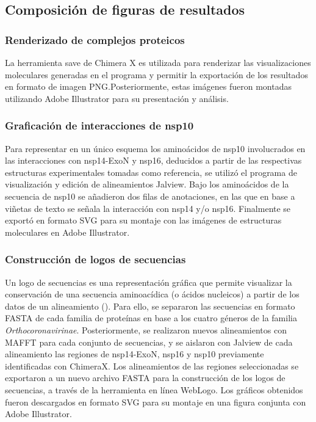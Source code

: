 \subsection{Composición de figuras de resultados}

\subsubsection{Renderizado de complejos proteicos}

La herramienta save de Chimera X es utilizada para renderizar las 
visualizaciones moleculares generadas en el programa y permitir la 
exportación de los resultados en formato de imagen PNG.\@ Posteriormente, 
estas imágenes fueron montadas utilizando Adobe Illustrator para su 
presentación y análisis.

\subsubsection{Graficación de interacciones de nsp10}

Para representar en un único esquema los aminoácidos de nsp10 involucrados 
en las interacciones con nsp14-ExoN y nsp16, deducidos a partir de las 
respectivas estructuras experimentales tomadas como referencia, se utilizó 
el programa de visualización y edición de alineamientos Jalview. Bajo los 
aminoácidos de la secuencia de nsp10 se añadieron dos filas de anotaciones, 
en las que en base a viñetas de texto se señala la interacción con nsp14 y/o
nsp16. Finalmente se exportó en formato SVG para su montaje con las imágenes
de estructuras moleculares en Adobe Illustrator.

\subsubsection{Construcción de logos de secuencias}

Un logo de secuencias es una representación gráfica que permite visualizar 
la conservación de una secuencia aminoacídica (o ácidos nucleicos) a partir 
de los datos de un alineamiento (\cite{schneider_sequence_1990}). Para ello, 
se separaron las secuencias en formato FASTA de cada familia de proteínas en 
base a los cuatro géneros de la familia \textit{Orthocoronavirinae}. 
Posteriormente, se realizaron nuevos alineamientos con MAFFT para cada 
conjunto de secuencias, y se aislaron con Jalview de cada alineamiento las 
regiones de nsp14-ExoN, nsp16 y nsp10 previamente identificadas con 
ChimeraX. Los alineamientos de las regiones seleccionadas se exportaron a un
nuevo archivo FASTA para la construcción de los logos de secuencias, a 
través de la herramienta en línea WebLogo. Los gráficos obtenidos fueron 
descargados en formato SVG para su montaje en una figura conjunta con Adobe 
Illustrator.